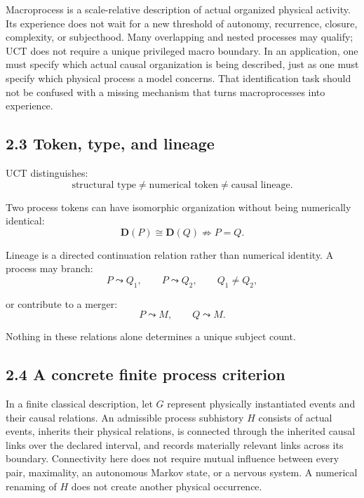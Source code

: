 \documentclass[
  11pt,
  a4paper,
]{article}
\begin{document}
Macroprocess is a scale-relative description of actual organized
physical activity. Its experience does not wait for a new threshold of
autonomy, recurrence, closure, complexity, or subjecthood. Many
overlapping and nested processes may qualify; UCT does not require a
unique privileged macro boundary. In an application, one must specify
which actual causal organization is being described, just as one must
specify which physical process a model concerns. That identification
task should not be confused with a missing mechanism that turns
macroprocesses into experience.

\hypertarget{token-type-and-lineage}{%
\subsection{2.3 Token, type, and lineage}\label{token-type-and-lineage}}

UCT distinguishes:
\nopagebreak[4]
\[
\boxed{
\text{structural type}
\neq
\text{numerical token}
\neq
\text{causal lineage}.
}
\]

Two process tokens can have isomorphic organization without being
numerically identical:
\nopagebreak[4]
\[
\mathbf D(P)\cong \mathbf D(Q)
\not\Rightarrow
P=Q.
\]

Lineage is a directed continuation relation rather than numerical
identity. A process may branch:
\nopagebreak[4]
\[
P\leadsto Q_1,
\qquad
P\leadsto Q_2,
\qquad
Q_1\neq Q_2,
\]

or contribute to a merger:
\nopagebreak[4]
\[
P\leadsto M,
\qquad
Q\leadsto M.
\]

Nothing in these relations alone determines a unique subject count.

\hypertarget{a-concrete-finite-process-criterion}{%
\subsection{2.4 A concrete finite process
criterion}\label{a-concrete-finite-process-criterion}}

In a finite classical description, let \(G\) represent physically
instantiated events and their causal relations. An admissible process
subhistory \(H\) consists of actual events, inherits their physical
relations, is connected through the inherited causal links over the
declared interval, and records materially relevant links across its
boundary. Connectivity here does not require mutual influence between
every pair, maximality, an autonomous Markov state, or a nervous system.
A numerical renaming of \(H\) does not create another physical
occurrence.
\end{document}
